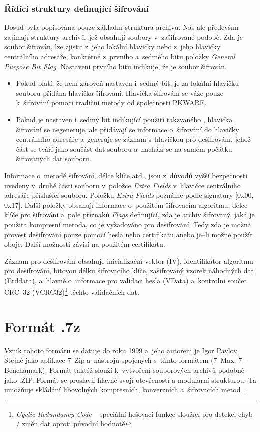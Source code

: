\subsubsection{Řídící struktury definující šifrování}
 Dosud byla popisována pouze základní struktura archivu. Nás ale především zajímají struktury
archivů, jež obsahují soubory v~zašifrované podobě. Zda je soubor šifrován, lze zjistit z~jeho
lokální hlavičky nebo z~jeho hlavičky centrálního adresáře, konkrétně z~prvního a~sedmého bitu
položky {\it General Purpose Bit Flag}. Nastavení prvního bitu indikuje, že je soubor šifrován.
\begin{itemize}
    \item Pokud platí, že není zároveň nastaven i~sedmý bit, je za lokální hlavičku souboru
        přidána hlavička šifrování. Hlavička šifrování se váže pouze k~šifrování pomocí tradiční
        metody od společnosti PKWARE.
    \item Pokud je nastaven i~sedmý bit indikující použití takzvaného , hlavička šifrování se negeneruje, ale přidávají se informace o~šifrování do
        hlavičky centrálního adresáře a~generuje se záznam s~hlavičkou pro dešifrování, jehož
	část se tváří jako součást dat souboru a~nachází se na samém počátku šifrovaných dat
	souboru.
\end{itemize}
Informace o~metodě šifrování, délce klíče atd., jsou z~důvodů vyšší bezpečnosti uvedeny v~druhé
části souboru v~položce {\it Extra Fields} v~hlavičce centrálního adresáře příslušící souboru.
Položku {\it Extra Fields} poznáme podle signatury [0x00, 0x17]. Další položky obsahují informace
o~použitém šifrovacím algoritmu, délce klíče pro šifrování a~pole příznaků {\it Flags} definující,
zda je archiv šifrovaný, jaká je použita kompresní metoda, co je vyžadováno pro dešifrování. Tedy
zda je možná provést dešifrování pouze pomocí hesla nebo certifikátu anebo je--li možné použít
oboje. Další možnosti závisí na použitém certifikátu.

 Záznam pro dešifrování obsahuje inicializační vektor (IV), identifikátor algoritmu pro
dešifrování, bitovou délku šifrovacího klíče, zašifrovaný vzorek náhodných dat (Erddata), a~hlavně
o~informace pro validaci hesla (VData) a~kontrolní součet CRC--32 (VCRC32)\footnote{{\it Cyclic
Redundancy Code} --
speciální hešovací funkce sloužící pro detekci chyb / změn dat oproti původní hodnotě} těchto
validačních dat. 

\section{Formát .7z}
\label{sec:7z}
Vznik tohoto formátu se datuje do roku 1999 a~jeho autorem je Igor Pavlov. Stejně jako aplikace
7--Zip a~nástrojů spojených s~tímto formátem (7--Max, 7--Benchamark). Formát taktéž slouží
k~vytvoření souborových archivů podobně jako .ZIP. Formát se proslavil hlavně svojí otevřeností a
modulární strukturou. Ta umožňuje skládání libovolných kompresních, konverzních a~šifrovacích
metod~\cite{7z:2015}.

